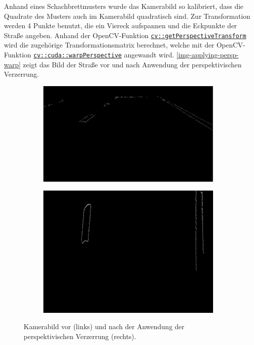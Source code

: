 \documentclass[a4paper,12pt]{report}
\begin{document}
	Anhand eines Schachbrettmusters wurde das Kamerabild so kalibriert, dass die Quadrate des Musters auch im Kamerabild quadratisch sind.
	Zur Transformation werden 4 Punkte benutzt, die ein Viereck aufspannen und die Eckpunkte der Straße angeben. Anhand der OpenCV-Funktion \href{https://docs.opencv.org/3.4.0/da/d54/group\_\_imgproc\_\_transform.html\#ga15302cbff82bdcddb70158a58b73d981}{\texttt{cv::get\-PerspectiveTransform}} \cite{opencv-doc} wird die zugehörige Transformationsmatrix berechnet, welche mit der OpenCV-Funktion \href{https://docs.opencv.org/3.4.0/db/d29/group\_\_cudawarping.html\#ga7a6cf95065536712de6b155f3440ccff}{\texttt{cv::cuda::warpPerspective}} \cite{opencv-doc} angewandt wird. \autoref{img-applying-persp-warp} zeigt das Bild der Straße vor und nach Anwendung der perspektivischen Verzerrung.

	\begin{figure}[h]
		\centering
		\begin{subfigure}[c]{0.45\textwidth}
			\includegraphics[width=\textwidth]{assets/Strasse-Canny.png}
		\end{subfigure}
		\begin{subfigure}[c]{0.45\textwidth}
			\includegraphics[width=.8\textwidth]{assets/Strasse-Persp.png}
		\end{subfigure}
		\caption{Kamerabild vor (links) und nach der Anwendung der perspektivischen Verzerrung (rechts).}
		\label{img-applying-persp-warp}
	\end{figure}
\end{document}
